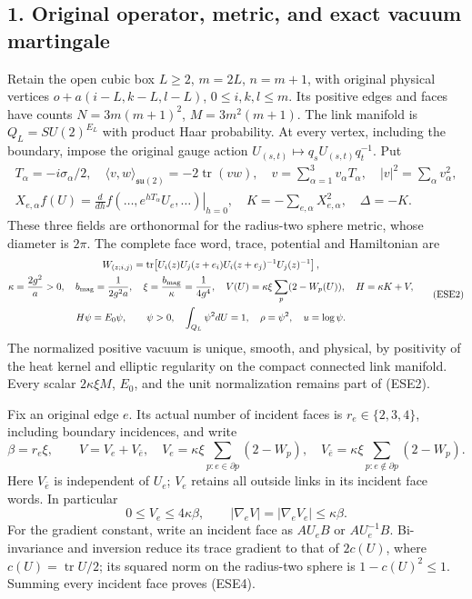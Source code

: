 \documentclass[11pt]{article}
\begin{document}
\subsection*{1. Original operator, metric, and exact vacuum martingale}

Retain the open cubic box \(L\ge2\), \(m=2L\), \(n=m+1\), with original physical vertices \(o+a(i-L,k-L,l-L)\), \(0\le i,k,l\le m\). Its positive edges and faces have counts \(N=3m(m+1)^2\), \(M=3m^2(m+1)\). The link manifold is \(Q_L=SU(2)^{E_L}\) with product Haar probability. At every vertex, including the boundary, impose the original gauge action \(U_{(s,t)}\mapsto q_sU_{(s,t)}q_t^{-1}\). Put
\[
 \begin{gathered}
 T_\alpha=-i\sigma_\alpha/2,\quad
 \langle v,w\rangle_{\mathfrak{su}(2)}=-2\operatorname{tr}(vw),\quad
 v=\sum_{\alpha=1}^3v_\alpha T_\alpha,\quad |v|^2=\sum_\alpha v_\alpha^2,\\
 X_{e,\alpha}f(U)=
  \left.\frac d{dh}f(\ldots,e^{hT_\alpha}U_e,\ldots)\right|_{h=0},
 \quad K=-\sum_{e,\alpha}X_{e,\alpha}^2,\quad
 \Delta=-K .
 \end{gathered}\tag{ESE1}
\]
These three fields are orthonormal for the radius-two sphere metric, whose diameter is \(2\pi\). The complete face word, trace, potential and Hamiltonian are
\[
 \begin{gathered}
 W_{(z;i,j)}
 =\operatorname{tr}\!\left[
 U_i(z)U_j(z+e_i)U_i(z+e_j)^{-1}U_j(z)^{-1}\right],\\
 \kappa=\frac{2g^2}{a}>0,\quad b_{\rm mag}=\frac1{2g^2a},\quad
 \xi=\frac{b_{\rm mag}}{\kappa}=\frac1{4g^4},\quad
 V(U)=\kappa\xi\sum_{p}(2-W_p(U)),\quad H=\kappa K+V,\\
 H\psi=E_0\psi,\qquad \psi>0,\quad\int_{Q_L}\psi^2dU=1,\quad
 \rho=\psi^2,\quad u=\log\psi.
 \end{gathered}\tag{ESE2}
\]
The normalized positive vacuum is unique, smooth, and physical, by positivity of the heat kernel and elliptic regularity on the compact connected link manifold. Every scalar \(2\kappa\xi M\), \(E_0\), and the unit normalization remains part of (ESE2).

Fix an original edge \(e\). Its actual number of incident faces is \(r_e\in\{2,3,4\}\), including boundary incidences, and write
\[
 \beta=r_e\xi,\qquad
 V=V_e+V_{\bar e},\quad
 V_e=\kappa\xi\sum_{p:e\in\partial p}(2-W_p),\quad
 V_{\bar e}=\kappa\xi\sum_{p:e\notin\partial p}(2-W_p).
 \tag{ESE3}
\]
Here \(V_{\bar e}\) is independent of \(U_e\); \(V_e\) retains all outside links in its incident face words. In particular
\[
 0\le V_e\le4\kappa\beta,\qquad
 |\nabla_eV|=|\nabla_eV_e|\le\kappa\beta.
 \tag{ESE4}
\]
For the gradient constant, write an incident face as \(A U_e B\) or \(A U_e^{-1}B\). Bi-invariance and inversion reduce its trace gradient to that of \(2c(U)\), where \(c(U)=\operatorname{tr}U/2\); its squared norm on the radius-two sphere is \(1-c(U)^2\le1\). Summing every incident face proves (ESE4).
\end{document}
